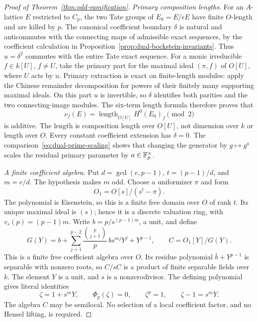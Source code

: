 \begin{proof}[Proof of Theorem~\ref{thm:odd-ramification}]
\emph{Primary composition lengths.}
For an $A$-lattice $E$ restricted to $C_p$, the two Tate groups of
$E_0=E/\epsilon E$ have finite $O$-length and are killed by $p$.
The canonical coefficient boundary $\delta$ is natural and
anticommutes with the connecting maps of admissible exact sequences,
by the coefficient calculation in
Proposition~\ref{prop:dual-bockstein-invariants}.
Thus $u=\delta^2$ commutes with the entire Tate exact sequence.
For a monic irreducible $f\in k[U]$, $f\ne U$, take the primary part
for the maximal ideal $(\pi,f)$ of $O[U]$, where $U$ acts by $u$.
Primary extraction is exact on finite-length modules: apply the
Chinese remainder decomposition for powers of their finitely many
supporting maximal ideals.
On this part $u$ is invertible, so $\delta$ identifies both parities
and the two connecting-image modules.  The six-term length formula
therefore proves that
\[
 \nu_f(E)=\operatorname{length}_{O[U]}H^0(E_0)_f\pmod2
\]
is additive.  The length is composition length over $O[U]$, not
dimension over $k$ or length over $O$.
Every constant coefficient extension has $\delta=0$.
The comparison~\eqref{eq:dual-prime-scaling} shows that changing the
generator by $g\mapsto g^a$ scales the residual primary parameter
by $a\in\mathbb F_p^\times$.

\emph{A finite coefficient algebra.}
Put $d=\gcd(e,p-1)$, $t=(p-1)/d$, and $m=e/d$.
The hypothesis makes $m$ odd.
Choose a uniformizer $\pi$ and form
\[
 O_1=O[s]/(s^t-\pi).
\]
The polynomial is Eisenstein, so this is a finite free domain over
$O$ of rank $t$.  Its unique maximal ideal is $(s)$; hence it is a
discrete valuation ring, with $v_s(p)=(p-1)m$.
Write $b=p/s^{(p-1)m}$, a unit, and define
\[
 G(Y)=b+\sum_{j=1}^{p-2}\frac{\binom p{j+1}}p\,
              b s^{mj}Y^j+Y^{p-1},\qquad C=O_1[Y]/G(Y).
\]
This is a finite free coefficient algebra over $O$.
Its residue polynomial $\bar b+Y^{p-1}$ is separable with nonzero
roots, so $C/sC$ is a product of finite separable fields over $k$.
The element $Y$ is a unit, and $s$ is a nonzerodivisor.
The defining polynomial gives literal identities
\[
 \zeta=1+s^mY,\qquad \Phi_p(\zeta)=0,\qquad
 \zeta^p=1,\qquad \zeta-1=s^mY.
\]
The algebra $C$ may be semilocal.  No selection of a local coefficient
factor, and no Hensel lifting, is required.


\end{proof}

